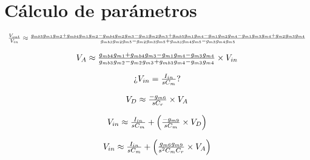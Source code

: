 \section{Cálculo de parámetros  \label{sec:s1}}

\begin{equation*}
	\begin{array}{l l}
		\frac{V_{out}}{V_{in}} \approx \frac{g_{mb3} g_{m1} g_{m2}+g_{mb4} g_{m1} g_{m2}-g_{mb4} g_{m2} g_{m3}-g_{m1} g_{m2} g_{m3}+g_{mb3} g_{m1} g_{m4}-g_{m1} g_{m2} g_{m4}-g_{m1} g_{m3} g_{m4}+g_{m2} g_{m3} g_{m4}}{g_{mb3} g_{m2} g_{m5}-g_{m2} g_{m3} g_{m5}+g_{mb3} g_{m4} g_{m5}-g_{m3} g_{m4} g_{m5}}
	\end{array}
\end{equation*}

\begin{equation*}
	\begin{array}{l l}
		V_{A} \approx \frac{g_{mb4} g_{m1}+g_{mb4} g_{m3}-g_{m1} g_{m4}-g_{m3} g_{m4}}{g_{mb3} g_{m2}-g_{m2} g_{m3}+g_{mb3} g_{m4}-g_{m3} g_{m4}}\times V_{in}
	\end{array}
\end{equation*}

\begin{equation*}
	\begin{array}{l l}
		\text{¿} V_{in} = \frac{I_{in}}{sC_{m}} \text{?}
	\end{array}
\end{equation*}

\begin{equation*}
	\begin{array}{l l}
		V_{D} \approx \frac{-g_{m6}}{sC_{r}}\times V_{A}
	\end{array}
\end{equation*}

\begin{equation*}
	\begin{array}{l l}
		V_{in} \approx \frac{I_{in}}{sC_{m}} + \left( \frac{-g_{m9}}{sC_{m}} \times V_{D} \right)
	\end{array}
\end{equation*}

\begin{equation*}
	\begin{array}{l l}
		V_{in} \approx \frac{I_{in}}{sC_{m}} + \left( \frac{g_{m6} g_{m9}}{s^{2} C_{m} C_{r}} \times V_{A} \right)
	\end{array}
\end{equation*}

